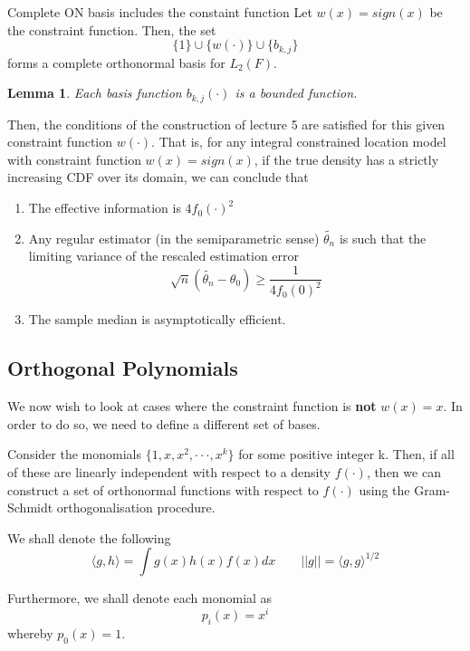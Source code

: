 \documentclass[twoside]{article}
\newtheorem{lemma}[theorem]{Lemma}
\begin{document}
\begin{proposition_exam}{Complete ON basis includes the constaint function}{} Let $w(x) = sign(x)$ be the constraint function. Then, the set 
\begin{equation}
  \{1\} \cup \{w(\cdot)\} \cup \{b_{k,j}\}
\end{equation}
forms a complete orthonormal basis for $L_2(F).$
\end{proposition_exam}

\begin{lemma} Each basis function $b_{k,j}(\cdot)$ is a bounded function.
\end{lemma}

Then, the conditions of the construction of lecture 5 are satisfied for this given constraint function $w(\cdot).$ That is, for any integral constrained location model with constraint function $w(x) = sign(x)$, if the true density has a strictly increasing CDF over its domain, we can conclude that 
\begin{enumerate}
  \item The effective information is $4f_0(\cdot)^2$
  \item Any regular estimator (in the semiparametric sense) $\tilde{\theta_n}$ is such that the limiting variance of the rescaled estimation error
  $$
  \sqrt{n}(\tilde{\theta_{n}} - \theta_0) \geq \frac{1}{4f_0(0)^2}
  $$
  \item The sample median is asymptotically efficient.
\end{enumerate}

\subsection{Orthogonal Polynomials}

We now wish to look at cases where the constraint function is \textbf{not} $w(x) = x.$ In order to do so, we need to define a different set of bases.

Consider the monomials $\{1, x, x^2, \cdot \cdot \cdot, x^k\}$ for some positive integer k. Then, if all of these are linearly independent with respect to a density $f(\cdot)$, then we can construct a set of orthonormal functions with respect to $f(\cdot)$ using the Gram-Schmidt orthogonalisation procedure. 

We shall denote the following
$$
\langle g, h \rangle = \int g(x)h(x)f(x)dx \quad \quad ||g|| = \langle g, g \rangle^{1/2}
$$

Furthermore, we shall denote each monomial as 
$$
p_i(x) = x^{i}
$$
whereby $p_0(x) = 1.$
\end{document}
